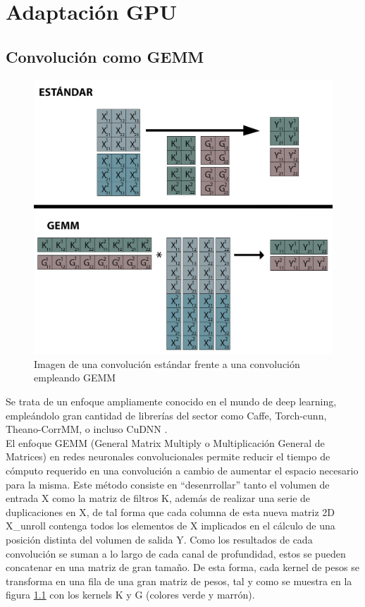 \chapter{Adaptación GPU}


\section{Convolución como GEMM \label{Intro_GEMMM}}

\begin{figure}[H]
	\centering
	\includegraphics[scale=0.35]{imagenes/conv_std_vs_gemm.jpg}  
	\caption{Imagen de una convolución estándar frente a una convolución empleando GEMM}
	\label{fig:conv_std_vs_gemm}
\end{figure}
Se trata de un enfoque ampliamente conocido en el mundo de deep learning, empleándolo gran cantidad de librerías del sector como Caffe, Torch-cunn, Theano-CorrMM, o incluso CuDNN \cite{conv_GEMM_FFT_comparacion}. \\
El enfoque GEMM (General Matrix Multiply o Multiplicación General de Matrices) en redes neuronales convolucionales permite reducir el tiempo de cómputo requerido en una convolución a cambio de aumentar el espacio necesario para la misma. Este método consiste en ``desenrrollar'' tanto el volumen de entrada X como la matriz de filtros K, además de realizar una serie de duplicaciones en X, de tal forma que cada columna de esta nueva matriz 2D X\_unroll contenga todos los elementos de X implicados en el cálculo de una posición distinta del volumen de salida Y. Como los resultados de cada convolución se suman a lo largo de cada canal de profundidad, estos se pueden concatenar en una matriz de gran tamaño. De esta forma, cada kernel de pesos se transforma en una fila de una gran matriz de pesos, tal y como se muestra en la figura \ref{fig:conv_std_vs_gemm} con los kernels K y G (colores verde y marrón). \\
